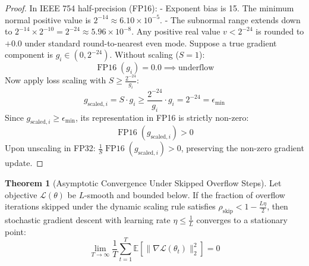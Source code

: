 \documentclass[11pt,a4paper]{article}
\theoremstyle{definition}
\newtheorem{theorem}{\textbf{Theorem}}[section]
\begin{document}
\begin{proof}
In IEEE 754 half-precision (FP16):
- Exponent bias is 15. The minimum normal positive value is $2^{-14} \approx 6.10 \times 10^{-5}$.
- The subnormal range extends down to $2^{-14} \times 2^{-10} = 2^{-24} \approx 5.96 \times 10^{-8}$.
Any positive real value $v < 2^{-24}$ is rounded to $+0.0$ under standard round-to-nearest even mode.
Suppose a true gradient component is $g_i \in (0, 2^{-24})$.
Without scaling ($S = 1$):
{\boldmath
\begin{equation}
\operatorname{FP16}(g_i) = 0.0 \implies \text{underflow}
\end{equation}
}
Now apply loss scaling with $S \ge \frac{2^{-24}}{g_i}$:
{\boldmath
\begin{equation}
g_{\text{scaled}, i} = S \cdot g_i \ge \frac{2^{-24}}{g_i} \cdot g_i = 2^{-24} = \epsilon_{\min}
\end{equation}
}
Since $g_{\text{scaled}, i} \ge \epsilon_{\min}$, its representation in FP16 is strictly non-zero:
{\boldmath
\begin{equation}
\operatorname{FP16}(g_{\text{scaled}, i}) > 0
\end{equation}
}
Upon unscaling in FP32: $\frac{1}{S} \operatorname{FP16}(g_{\text{scaled}, i}) > 0$, preserving the non-zero gradient update.
\end{proof}

\begin{theorem}[Asymptotic Convergence Under Skipped Overflow Steps]
Let objective $\mathcal{L}(\theta)$ be $L$-smooth and bounded below. If the fraction of overflow iterations skipped under the dynamic scaling rule satisfies $\rho_{\text{skip}} < 1 - \frac{L \eta}{2}$, then stochastic gradient descent with learning rate $\eta \le \frac{1}{L}$ converges to a stationary point:
{\boldmath
\begin{equation}
\lim_{T \to \infty} \frac{1}{T} \sum_{t=1}^T \mathbb{E}\left[ \|\nabla \mathcal{L}(\theta_t)\|_2^2 \right] = 0
\end{equation}
}
\end{theorem}
\end{document}
